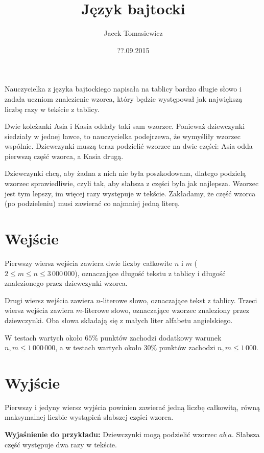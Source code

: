\documentclass[zad,zawodnik,utf8]{sinol}
\title{Język bajtocki}
\author{Jacek Tomasiewicz}
\date{??.09.2015}
\begin{document}
  \begin{tasktext}%
Nauczycielka z języka bajtockiego napisała na tablicy bardzo długie słowo i  zadała uczniom znalezienie wzorca, który będzie występował jak największą liczbę razy w tekście z tablicy.

Dwie koleżanki Asia i Kasia oddały taki sam wzorzec. Ponieważ dziewczynki siedziały w jednej ławce, to nauczycielka podejrzewa, że wymyśliły wzorzec wspólnie. Dziewczynki muszą teraz podzielić wzorzec na dwie części: Asia odda pierwszą część wzorca, a Kasia drugą. 

Dziewczynki chcą, aby żadna z nich nie była poszkodowana, dlatego podzielą wzorzec sprawiedliwie, czyli tak, aby słabsza z części była jak najlepsza. Wzorzec jest tym lepszy, im więcej razy występuje w tekście. Zakładamy, że część wzorca (po podzieleniu) musi zawierać co najmniej jedną literę.

  \section{Wejście}
Pierwszy wiersz wejścia zawiera dwie liczby całkowite $n$ i $m$ ($2 \leq m \leq n \leq 3\,000\,000$), oznaczające długość tekstu z tablicy i długość znalezionego przez dziewczynki wzorca.

Drugi wiersz wejścia zawiera $n$-literowe słowo, oznaczające tekst z tablicy. Trzeci wiersz wejścia zawiera $m$-literowe słowo, oznaczające wzorzec znaleziony przez dziewczynki. Oba słowa składają się z małych liter alfabetu angielskiego.

W testach wartych około $65\%$ punktów zachodzi dodatkowy warunek $n, m \leq 1\,000\,000$, a w testach wartych około $30\%$ punktów zachodzi $n, m \leq 1\,000$.

  \section{Wyjście}
	
Pierwszy i jedyny wiersz wyjścia powinien zawierać jedną liczbę całkowitą, równą maksymalnej liczbie wystąpień słabszej części wzorca.

     \makecompactexample

	\medskip
	\noindent
	\textbf{Wyjaśnienie do przykładu:} Dziewczynki mogą podzielić wzorzec $ab|a$. Słabsza część występuje dwa razy w tekście. 

  \end{tasktext}
\end{document}
